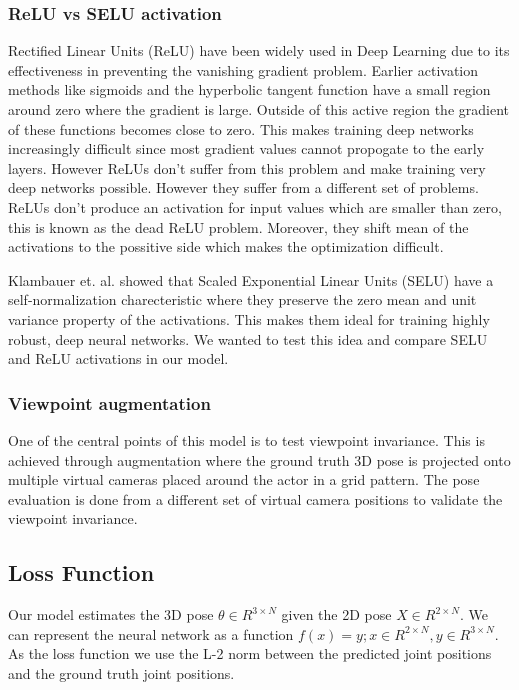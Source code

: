 \subsubsection{ReLU vs SELU activation}

Rectified Linear Units (ReLU) \parencite{nair2010rectified} have been widely used in Deep Learning due to its effectiveness in preventing the vanishing gradient problem. Earlier activation methods like sigmoids and the hyperbolic tangent function have a small region around zero where the gradient is large. Outside of this active region the gradient of these functions becomes close to zero. This makes training deep networks increasingly difficult since most gradient values cannot propogate to the early layers. However ReLUs don't suffer from this problem and make training very deep networks possible. However they suffer from a different set of problems. ReLUs don't produce an activation for input values which are smaller than zero, this is known as the dead ReLU problem. Moreover, they shift mean of the activations to the possitive side which makes the optimization difficult. 

Klambauer et. al. \parencite{klambauer2017self} showed that Scaled Exponential Linear Units (SELU) have a self-normalization charecteristic where they preserve the zero mean and unit variance property of the activations. This makes them ideal for training highly robust, deep neural networks. We wanted to test this idea and compare SELU and ReLU activations in our model.

\subsubsection{Viewpoint augmentation}

One of the central points of this model is to test viewpoint invariance. This is achieved through augmentation where the ground truth 3D pose is projected onto multiple virtual cameras placed around the actor in a grid pattern. The pose evaluation is done from a different set of virtual camera positions to validate the viewpoint invariance. %

\subsection{Loss Function}

Our model estimates the 3D pose $\theta \in R^{3\times N}$ given the 2D pose $X \in R^{2\times N}$. We can represent the neural network as a function $f(x) = y ; x \in R^{2\times N}, y \in R^{3\times N} $. As the loss function we use the L-2 norm between the predicted joint positions and the ground truth joint positions.

